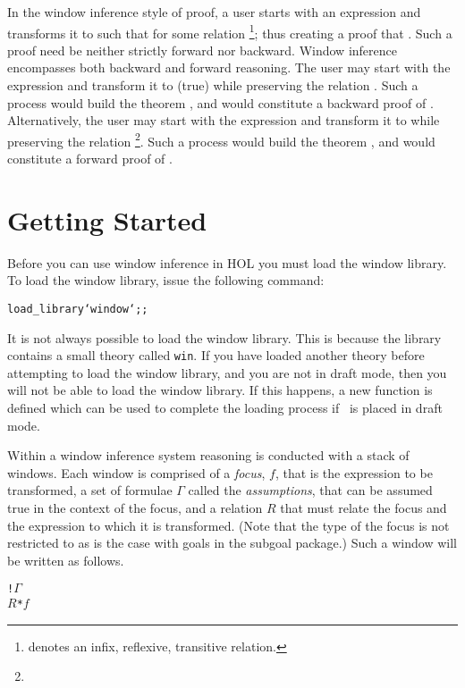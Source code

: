 In the window inference style of proof,
a user starts with an expression  and transforms it to  such
that  for some relation \footnote
{ denotes an infix, reflexive, transitive relation.};
thus creating a proof that .
Such a proof need be neither strictly forward nor backward.
Window inference encompasses both backward and forward reasoning.
The user may start with the expression  and transform it to
(true) while preserving the relation .
Such a process would build the theorem ,
and would constitute a backward proof of .
Alternatively,
the user may start with the expression  and transform it to
 while preserving the relation
\footnote
{ }.
Such a process would build the theorem
,
and would constitute a forward proof of .

\section{Getting Started}	\label{sec:start}

Before you can use window inference in HOL you must load the
window library.
To load the window library, issue the following command:
\begin{hol}\begin{alltt}
	load_library `window`;;
\end{alltt}\end{hol}
It is not always possible to load the window library.
This is because the library contains a small theory called {\tt win}.
If you have loaded another theory before attempting to load the window
library, and you are not in draft mode, then you will not be able to 
load the window library.
If this happens, a new function
 is defined which
can be used to complete the loading process if \HOL\ is placed in draft mode.

Within a window inference system reasoning is conducted with a stack of windows.
Each window is comprised of a {\it focus},
$f$, that is the expression to be transformed,
a set of formulae $\Gamma$ called the {\it assumptions},
that can be assumed true in the context of the focus, and a
relation $R$\/ that
must relate the focus and the expression to which it is transformed.
(Note that the type of the focus is not restricted to  as is the
case with goals in the subgoal package.)
Such a window will be written as follows.
\begin{hol}\begin{alltt}
     ! \(\Gamma\)
   \(R\!\) * \(f\)
\end{alltt}\end{hol}

